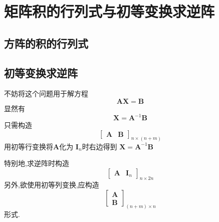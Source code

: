 \newpage
\section{矩阵积的行列式与初等变换求逆阵}
\subsection{方阵的积的行列式}
\subsection{初等变换求逆阵}
不妨将这个问题用于解方程
\[
    \bm{A}\bm{X} = \bm{B}
\]
显然有
\[
    \bm{X} = \bm{A}^{-1}\bm{B}
\]
只需构造
\[\begin{bmatrix}
        \bm{A} & \bm{B}
    \end{bmatrix}_{n \times \left(n+m\right)}
\]
用初等行变换将$\bm{A}$化为
$\bm{I}_n$时右边得到
$\bm{X} = \bm{A}^{-1}\bm{B}$

特别地,求逆阵时构造
\[
    \begin{bmatrix}
        \bm{A} & \bm{I}_n
    \end{bmatrix}_{n \times 2n}
\]
另外,欲使用初等列变换,应构造
\[
    \begin{bmatrix}
        \bm{A} \\
        \bm{B}
    \end{bmatrix}_{\left(n+m\right) \times n}
\]
形式.